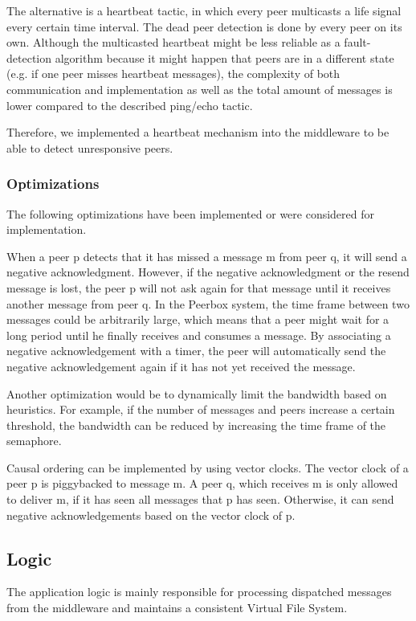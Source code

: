The alternative is a heartbeat tactic, in which every peer multicasts a life signal every certain time interval. The dead peer detection is done by every peer on its own. Although the multicasted heartbeat might be less reliable as a fault-detection algorithm because it might happen that peers are in a different state (e.g. if one peer misses heartbeat messages), the complexity of both communication and implementation as well as the total amount of messages is lower compared to the described ping/echo tactic.

Therefore, we implemented a heartbeat mechanism into the middleware to be able to detect unresponsive peers.
\clearpage
\subsubsection{Optimizations}
The following optimizations have been implemented or were considered for implementation.

When a peer p detects that it has missed a message m from peer q, it will send a negative acknowledgment. However, if the negative acknowledgment or the resend message is lost, the peer p will not ask again for that message until it receives another message from peer q. 
In the Peerbox system, the time frame between two messages could be arbitrarily large, which means that a peer might wait for a long period until he finally receives and consumes a message. 
By associating a negative acknowledgement with a timer, the peer will automatically send the negative acknowledgement again if it has not yet received the message.

Another optimization would be to dynamically limit the bandwidth based on heuristics. For example, if the number of messages and peers increase a certain threshold, the bandwidth can be reduced by increasing the time frame of the semaphore. 

Causal ordering can be implemented by using vector clocks. The vector clock of a peer p is piggybacked to message m. A peer q, which receives m is only allowed to deliver m, if it has seen all messages that p has seen. Otherwise, it can send negative acknowledgements based on the vector clock of p. 

\subsection{Logic}
The application logic is mainly responsible for processing dispatched messages from the middleware and maintains a consistent Virtual File System.
    
